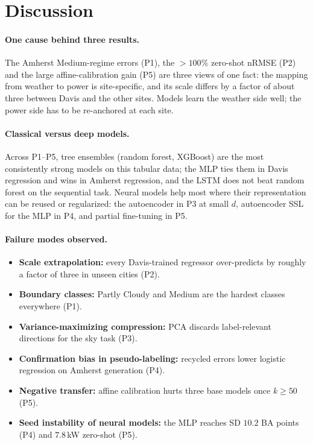 \documentclass[11pt,letterpaper]{article}
\begin{document}
\section{Discussion}\label{sec:discussion}
\paragraph{One cause behind three results.} The Amherst Medium-regime errors (P1), the $>100\%$
zero-shot nRMSE (P2) and the large affine-calibration gain (P5) are three views of one fact: the
mapping from weather to power is site-specific, and its scale differs by a factor of about three
between Davis and the other sites. Models learn the weather side well; the power side has to be
re-anchored at each site.

\paragraph{Classical versus deep models.} Across P1--P5, tree ensembles (random forest, XGBoost)
are the most consistently strong models on this tabular data; the MLP ties them in Davis
regression and wins in Amherst regression, and the LSTM does not beat random forest on the
sequential task. Neural models help most where their representation can be reused or regularized:
the autoencoder in P3 at small $d$, autoencoder SSL for the MLP in P4, and partial fine-tuning in P5.

\paragraph{Failure modes observed.}
\begin{itemize}[leftmargin=1.5em,itemsep=2pt]
\item \textbf{Scale extrapolation:} every Davis-trained regressor over-predicts by roughly a factor of
three in unseen cities (P2).
\item \textbf{Boundary classes:} Partly Cloudy and Medium are the hardest classes everywhere (P1).
\item \textbf{Variance-maximizing compression:} PCA discards label-relevant directions for the sky task (P3).
\item \textbf{Confirmation bias in pseudo-labeling:} recycled errors lower logistic regression on Amherst generation (P4).
\item \textbf{Negative transfer:} affine calibration hurts three base models once $k\ge50$ (P5).
\item \textbf{Seed instability of neural models:} the MLP reaches SD $10.2$ BA points (P4) and $7.8$\,kW zero-shot (P5).
\end{itemize}
\end{document}
